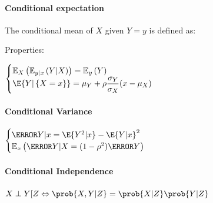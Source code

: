 \paragraph{Conditional expectation}
The conditional mean of $X$ given $Y=y$ is defined as:
\begin{center}
\end{center}

Properties:
\begin{center}
	$\begin{cases}
        \mathbb{E}_{X}\left(\mathbb{E}_{y|x}\left(Y|X\right)\right)=
        \mathbb{E}_{y}\left(Y\right)\\
	\E{Y|\left\{ X=x \right\}}=\mu_{Y}+\rho\dfrac{\sigma_{Y}}{\sigma_{X}}(x-\mu_{X})
	\end{cases}$	
\end{center}


\paragraph{Conditional Variance}
\begin{center}
	$\begin{cases}
	\V{Y|x}=\E{Y^{2}|x}-\E{Y|x}^{2}\\
	\mathbb{E}_{x}\left( \V{Y|X}=(1-\rho^{2})\V{Y} \right)
	\end{cases}$
\end{center}


\paragraph{Conditional Independence}
$X\perp Y[Z \Leftrightarrow \prob{X,Y|Z}=\prob{X|Z}\prob{Y|Z}$

